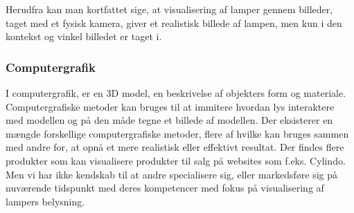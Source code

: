 Herudfra kan man kortfattet sige, at visualisering af lamper gennem billeder, taget med et fysisk kamera, giver et realistisk billede af lampen, men kun i den kontekst og vinkel billedet er taget i. 




\subsubsection{Computergrafik}
\label{sec:computergrafik}
I computergrafik, er en 3D model, en beskrivelse af objekters form og materiale.\cite{computergrafik_introduktion} Computergrafiske metoder kan bruges til at immitere hvordan lys interaktere med modellen og på den måde tegne et billede af modellen. Der eksisterer en mængde forskellige computergrafiske metoder, flere af hvilke kan bruges sammen med andre for, at opnå et mere realistisk eller effektivt resultat. Der findes flere produkter som kan visualisere produkter til salg på websites som f.eks. Cylindo\cite{Cylindo}. Men vi har ikke kendskab til at andre specialisere sig, eller markedsføre sig på nuværende tidspunkt med deres kompetencer med fokus på visualisering af lampers belysning.

